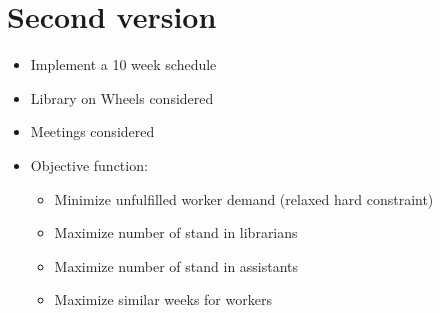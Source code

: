 \documentclass{article}
\begin{document}
	\section*{Second version }
	\begin{itemize}
		\item Implement a 10 week schedule
		\item Library on Wheels considered
		\item Meetings considered
		\item Objective function:
				\begin{itemize}
				\item Minimize unfulfilled worker demand (relaxed hard constraint)
				\item Maximize number of stand in librarians
				\item Maximize number of stand in assistants
				\item Maximize similar weeks for workers
				\end{itemize}
				
	\end{itemize}
	
	
\end{document}
